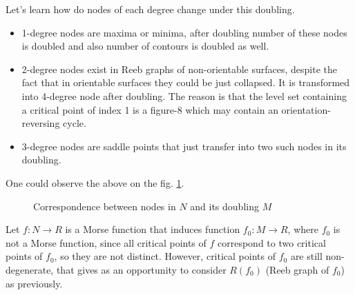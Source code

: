 \documentclass[]{article}
\begin{document}
Let's learn how do nodes of each degree change under this doubling. 
\begin{itemize}
    \item 1-degree nodes are maxima or minima, after doubling number of these nodes is doubled and also number of contours is doubled as well. 
    \item 2-degree nodes exist in Reeb graphs of non-orientable surfaces, despite the fact that in orientable surfaces they could be just collapsed. It is transformed into 4-degree node after doubling. The reason is that the level set containing a critical point of index 1 is a figure-8 which may contain an orientation-reversing cycle.
    \item 3-degree nodes are saddle points that just transfer into two such nodes in its doubling. 
\end{itemize}


One could observe the above on the fig. \ref{fig:Nodes}. 
\begin{figure}[h!]
\caption{Correspondence between nodes in $N$ and its doubling $M$}
\label{fig:Nodes}
\end{figure}
Let $f: N \rightarrow R$ is a Morse function that induces function $f_0: M \rightarrow R$, where $f_0$ is not a Morse function, since all critical points of $f$ correspond to two critical points of $f_0$, so they are not distinct. However, critical points of $f_0$ are still non-degenerate, that gives as an opportunity to consider $R(f_0)$ (Reeb graph of $f_0$) as previously. \\
\end{document}
